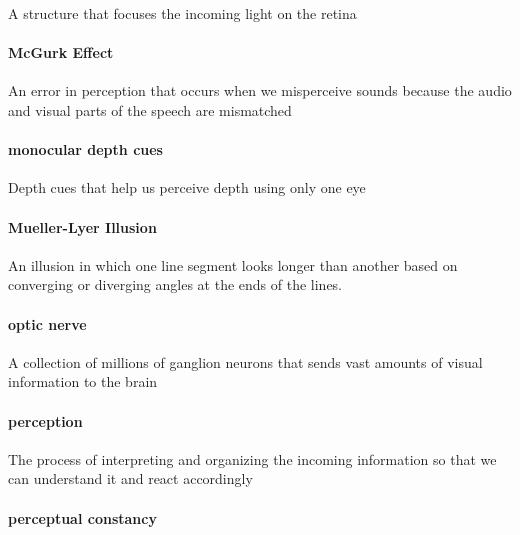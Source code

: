 \documentclass[
]{krantz}
\begin{document}
A structure that focuses the incoming light on the retina

\paragraph*{McGurk Effect}\label{mcgurk-effect}

An error in perception that occurs when we misperceive sounds because the audio and visual parts of the speech are mismatched

\paragraph*{monocular depth cues}\label{monocular-depth-cues}

Depth cues that help us perceive depth using only one eye

\paragraph*{Mueller-Lyer Illusion}\label{mueller-lyer-illusion}

An illusion in which one line segment looks longer than another based on converging or diverging angles at the ends of the lines.

\paragraph*{optic nerve}\label{optic-nerve}

A collection of millions of ganglion neurons that sends vast amounts of visual information to the brain

\paragraph*{perception}\label{perception-1}

The process of interpreting and organizing the incoming information so that we can understand it and react accordingly

\paragraph*{perceptual constancy}\label{perceptual-constancy}
\end{document}

